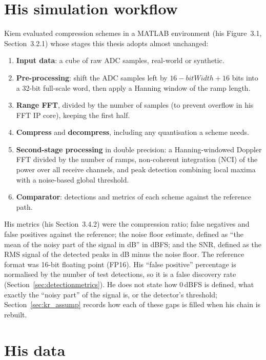 \section{His simulation workflow}
\label{sec:kc_workflow}

Kiem evaluated compression schemes in a MATLAB environment (his Figure~3.1,
Section~3.2.1) whose stages this thesis adopts almost unchanged:

\begin{enumerate}
\item \textbf{Input data}: a cube of raw ADC samples, real-world or synthetic.
\item \textbf{Pre-processing}: shift the ADC samples left by
$16 - \mathit{bitWidth} + 16$ bits into a 32-bit full-scale word, then apply a
Hanning window of the ramp length.
\item \textbf{Range FFT}, divided by the number of samples (to prevent overflow
in his FFT IP core), keeping the first half.
\item \textbf{Compress} and \textbf{decompress}, including any quantisation a
scheme needs.
\item \textbf{Second-stage processing} in double precision: a Hanning-windowed
Doppler FFT divided by the number of ramps, non-coherent integration (NCI) of
the power over all receive channels, and peak detection combining local maxima
with a noise-based global threshold.
\item \textbf{Comparator}: detections and metrics of each scheme against the
reference path.
\end{enumerate}

His metrics (his Section~3.4.2) were the compression ratio; false negatives
and false positives against the reference; the noise floor estimate, defined
as ``the mean of the noisy part of the signal in dB'' in dBFS; and the SNR,
defined as the RMS signal of the detected peaks in dB minus the noise floor.
The reference format was 16-bit floating point (FP16). His ``false positive''
percentage is normalised by the number of test detections, so it is a false
discovery rate (Section~\ref{sec:detectionmetrics}). He does not state how
0\,dBFS is defined, what exactly the ``noisy part'' of the signal is, or the
detector's threshold; Section~\ref{sec:kr_assump} records how each of these
gaps is filled when his chain is rebuilt.

\section{His data}
\label{sec:kc_data}

